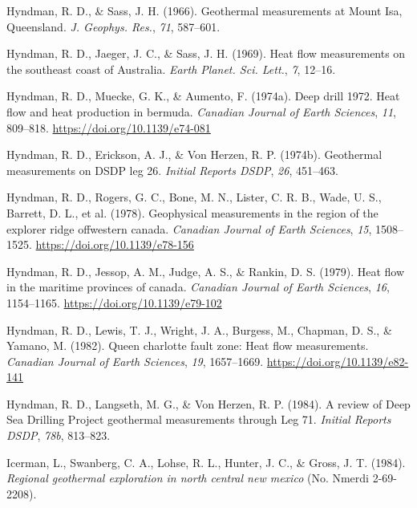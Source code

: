 \begin{CSLReferences}{1}{1}
\leavevmode{}%
Hyndman, R. D., \& Sass, J. H. (1966). Geothermal measurements at {Mount Isa, Queensland}. \emph{J. Geophys. Res.}, \emph{71}, 587--601.

\leavevmode{}%
Hyndman, R. D., Jaeger, J. C., \& Sass, J. H. (1969). Heat flow measurements on the southeast coast of {Australia}. \emph{Earth Planet. Sci. Lett.}, \emph{7}, 12--16.

\leavevmode{}%
Hyndman, R. D., Muecke, G. K., \& Aumento, F. (1974a). Deep drill 1972. Heat flow and heat production in bermuda. \emph{Canadian Journal of Earth Sciences}, \emph{11}, 809--818. \url{https://doi.org/10.1139/e74-081}

\leavevmode{}%
Hyndman, R. D., Erickson, A. J., \& Von Herzen, R. P. (1974b). Geothermal measurements on DSDP leg 26. \emph{Initial Reports DSDP}, \emph{26}, 451--463.

\leavevmode{}%
Hyndman, R. D., Rogers, G. C., Bone, M. N., Lister, C. R. B., Wade, U. S., Barrett, D. L., et al. (1978). Geophysical measurements in the region of the explorer ridge offwestern canada. \emph{Canadian Journal of Earth Sciences}, \emph{15}, 1508--1525. \url{https://doi.org/10.1139/e78-156}

\leavevmode{}%
Hyndman, R. D., Jessop, A. M., Judge, A. S., \& Rankin, D. S. (1979). Heat flow in the maritime provinces of canada. \emph{Canadian Journal of Earth Sciences}, \emph{16}, 1154--1165. \url{https://doi.org/10.1139/e79-102}

\leavevmode{}%
Hyndman, R. D., Lewis, T. J., Wright, J. A., Burgess, M., Chapman, D. S., \& Yamano, M. (1982). Queen charlotte fault zone: Heat flow measurements. \emph{Canadian Journal of Earth Sciences}, \emph{19}, 1657--1669. \url{https://doi.org/10.1139/e82-141}

\leavevmode{}%
Hyndman, R. D., Langseth, M. G., \& Von Herzen, R. P. (1984). A review of {Deep Sea Drilling Project} geothermal measurements through {Leg 71}. \emph{Initial Reports DSDP}, \emph{78b}, 813--823.

\leavevmode{}%
Icerman, L., Swanberg, C. A., Lohse, R. L., Hunter, J. C., \& Gross, J. T. (1984). \emph{Regional geothermal exploration in north central new mexico} (No. Nmerdi 2-69-2208).


\end{CSLReferences}
